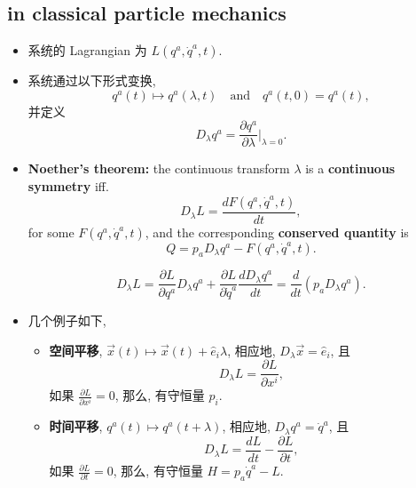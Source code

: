 \subsection{in classical particle mechanics}
\begin{itemize}
	\item 系统的 Lagrangian 为 $L(q^a, \dot{q}^a, t)$.
	
	\item 系统通过以下形式变换,
	\begin{equation}
		q^a(t) \mapsto q^a(\lambda, t) \quad \text{and} \quad q^a(t, 0) = q^a(t),
	\end{equation}
	并定义
	\begin{equation}
		D_\lambda q^a = \frac{\partial q^a}{\partial \lambda} \Big|_{\lambda = 0}.
	\end{equation}
	
	\item \textbf{Noether's theorem:} the continuous transform $\lambda$ is a \textbf{continuous symmetry} iff.
	\begin{equation}
		D_\lambda L = \frac{d F(q^a, \dot{q}^a, t)}{dt},
	\end{equation}
	for some $F(q^a, \dot{q}^a, t)$, and the corresponding \textbf{conserved quantity} is
	\begin{equation}
		Q = p_a D_\lambda q^a - F(q^a, \dot{q}^a, t).
	\end{equation}
	
	\begin{tcolorbox}[title=proof:]
		\begin{equation}
			D_\lambda L = \frac{\partial L}{\partial q^a} D_\lambda q^a + \frac{\partial L}{\partial \dot{q}^a} \frac{d D_\lambda q^a}{dt} = \frac{d}{dt} (p_a D_\lambda q^a).
		\end{equation}
	\end{tcolorbox}
	
	\item 几个例子如下,
	\begin{itemize}
		\item \textbf{空间平移}, $\vec{x}(t) \mapsto \vec{x}(t) + \hat{e}_i \lambda$, 相应地, $D_\lambda \vec{x} = \hat{e}_i$, 且
		\begin{equation}
			D_\lambda L = \frac{\partial L}{\partial x^i},
		\end{equation}
		如果 $\frac{\partial L}{\partial x^i} = 0$, 那么, 有守恒量 $p_i$.
		
		\item \textbf{时间平移}, $q^a(t) \mapsto q^a(t + \lambda)$, 相应地, $D_\lambda q^a = \dot{q}^a$, 且
		\begin{equation}
			D_\lambda L = \frac{d L}{dt} - \frac{\partial L}{\partial t},
		\end{equation}
		如果 $\frac{\partial L}{\partial t} = 0$, 那么, 有守恒量 $H = p_a \dot{q}^a - L$.
		

\end{itemize}
\end{itemize}
